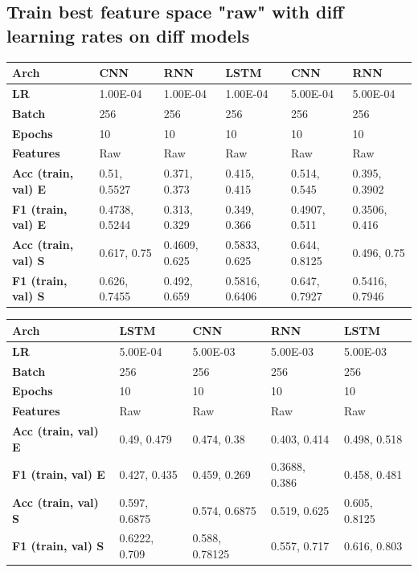 \documentclass[12pt,a4paper]{article}
\begin{document}
    \subsection{Train best feature space "raw" with diff learning rates on diff models}
    \begin{table}[!ht]
    \raggedright
    \begin{tabular}{|l|l|l|l|l|l|}
    \hline
        \textbf{Arch} & CNN & RNN & LSTM & CNN & RNN \\ \hline
        \textbf{LR} & 1.00E-04 & 1.00E-04 & 1.00E-04 & 5.00E-04 & 5.00E-04 \\ \hline
        \textbf{Batch} & 256 & 256 & 256 & 256 & 256 \\ \hline
        \textbf{Epochs} & 10 & 10 & 10 & 10 & 10 \\ \hline
        \textbf{Features} & Raw & Raw & Raw & Raw & Raw \\ \hline
        \textbf{Acc (train, val) E} & 0.51, 0.5527 & 0.371, 0.373 & 0.415, 0.415 & 0.514, 0.545 & 0.395, 0.3902 \\ \hline
        \textbf{F1 (train, val) E} & 0.4738, 0.5244 & 0.313, 0.329 & 0.349, 0.366 & 0.4907, 0.511 & 0.3506, 0.416 \\ \hline
        \textbf{Acc (train, val) S} & 0.617, 0.75 & 0.4609, 0.625 & 0.5833, 0.625 & 0.644, 0.8125 & 0.496, 0.75 \\ \hline
        \textbf{F1 (train, val) S} & 0.626, 0.7455 & 0.492, 0.659 & 0.5816, 0.6406  & 0.647, 0.7927 & 0.5416, 0.7946 \\ \hline
    \end{tabular}
\end{table}
\begin{table}[!ht]
    \raggedright
    \begin{tabular}{|l|l|l|l|l|}
    \hline
        \textbf{Arch} & LSTM & CNN & RNN & LSTM \\ \hline
        \textbf{LR} & 5.00E-04 & 5.00E-03 & 5.00E-03 & 5.00E-03 \\ \hline
        \textbf{Batch} & 256 & 256 & 256 & 256 \\ \hline
        \textbf{Epochs} & 10 & 10 & 10 & 10 \\ \hline
        \textbf{Features} & Raw & Raw & Raw & Raw \\ \hline
        \textbf{Acc (train, val) E} & 0.49, 0.479 & 0.474, 0.38 & 0.403, 0.414 & 0.498, 0.518 \\ \hline
        \textbf{F1 (train, val) E} & 0.427, 0.435 & 0.459, 0.269 & 0.3688, 0.386 & 0.458, 0.481 \\ \hline
        \textbf{Acc (train, val) S} & 0.597, 0.6875 & 0.574, 0.6875 & 0.519, 0.625 & 0.605, 0.8125 \\ \hline
        \textbf{F1 (train, val) S} & 0.6222, 0.709 & 0.588, 0.78125 & 0.557, 0.717 & 0.616, 0.803 \\ \hline
    \end{tabular}
\end{table}
    \newpage
\end{document}
